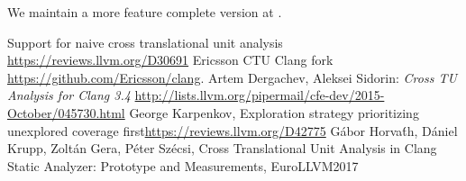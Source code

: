 \documentclass[sigconf]{acmart}
\begin{document}
We maintain a more feature complete version at \cite{ericsson-ctu}.



\begin{thebibliography}{9}
 Support for naive cross translational unit analysis \url{https://reviews.llvm.org/D30691}
 Ericsson CTU Clang fork \url{https://github.com/Ericsson/clang}.
 Artem Dergachev, Aleksei Sidorin: \emph{Cross TU Analysis for Clang 3.4}
  \url{http://lists.llvm.org/pipermail/cfe-dev/2015-October/045730.html}
 George Karpenkov, Exploration strategy prioritizing unexplored coverage first\url{https://reviews.llvm.org/D42775}
 G\'abor Horva\'th, D\'aniel Krupp, Zolt\'an Gera, P\'eter Sz\'ecsi, Cross Translational Unit Analysis in Clang Static Analyzer: Prototype and Measurements, EuroLLVM2017
\end{thebibliography}
\end{document}
